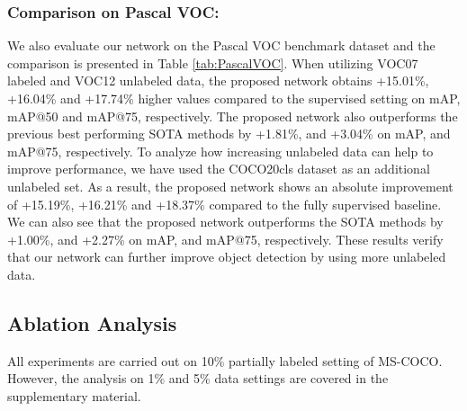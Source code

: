 \documentclass[10pt,twocolumn,letterpaper]{article}
\begin{document}
\subsubsection{Comparison on Pascal VOC:}
We also evaluate our network on the Pascal VOC benchmark dataset and the comparison is presented in Table \ref{tab:PascalVOC}. When utilizing VOC07 labeled and VOC12 unlabeled data, the proposed network obtains +15.01\%, +16.04\% and +17.74\% higher values compared to the supervised setting on mAP, mAP@50 and mAP@75, respectively.
The proposed network also outperforms the previous best performing SOTA methods \cite{LabelMatch, DDT} by +1.81\%, and +3.04\% on mAP, and mAP@75, respectively. To analyze how increasing unlabeled data can help to improve performance, we have used the COCO20cls dataset as an additional unlabeled set. As a result, the proposed network shows an absolute improvement of +15.19\%, +16.21\% and +18.37\% compared to the fully supervised baseline. We can also see that the proposed network outperforms the SOTA methods \cite{li2021rethinking} by +1.00\%, and +2.27\% on mAP, and mAP@75, respectively. These results verify that our network can further improve object detection by using more unlabeled data.



\subsection{Ablation Analysis}\label{sec:abl}
All experiments are carried out on 10\% partially labeled setting of MS-COCO. However, the analysis on 1\% and 5\% data settings are covered in the supplementary material.
\end{document}

